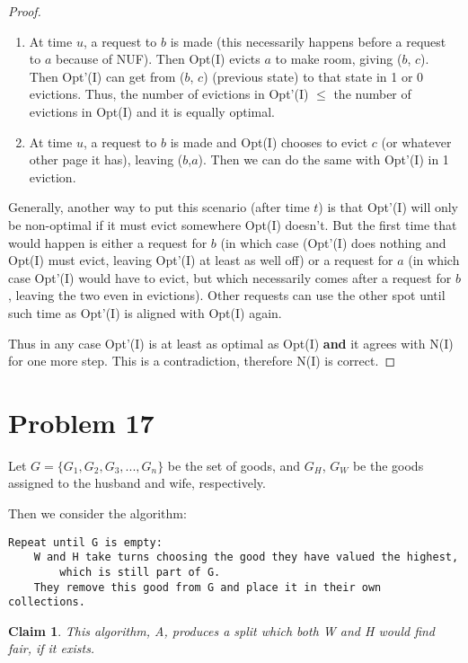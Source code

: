 \documentclass{article}
\newtheorem{thm}{Claim}
\providecommand{\prob}[1]{\section*{Problem #1}}
\begin{document}
\begin{proof}
\begin{enumerate}[label=\textbf{Case \arabic*.}]
			\item  At time $u$, a request to $b$ is made (this necessarily happens before a request to $a$ because of NUF). Then Opt(I) evicts $a$ to make room, giving ($b$, $c$). Then Opt'(I) can get from ($b$, $c$) (previous state) to that state in 1 or 0 evictions. Thus, the number of evictions in Opt'(I) $\leq$ the number of evictions in Opt(I) and it is equally optimal.
			
		 	\item At time $u$, a request to $b$ is made and Opt(I) chooses to evict $c$ (or whatever other page it has), leaving ($b$,$a$). Then we can do the same with Opt'(I) in 1 eviction.
		\end{enumerate}
	
		Generally, another way to put this scenario (after time $t$) is that Opt'(I) will only be non-optimal if it must evict somewhere Opt(I) doesn't. But the first time that would happen is either a request for $b$ (in which case (Opt'(I) does nothing and Opt(I) must evict, leaving Opt'(I) at least as well off) or a request for $a$ (in which case Opt'(I) would have to evict, but which necessarily comes after a request for $b$, leaving the two even in evictions). Other requests can use the other spot until such time as Opt'(I) is aligned with Opt(I) again.
	
		Thus in any case Opt'(I) is at least as optimal as Opt(I) \textbf{and} it agrees with N(I) for one more step. This is a contradiction, therefore N(I) is correct.
	\end{proof}

	\prob{17}
	Let $G = \{G_1, G_2, G_3, ..., G_n\}$ be the set of goods, and $G_H$, $G_W$ be the goods assigned to the husband and wife, respectively.
	
	Then we consider the algorithm:

	\begin{lstlisting}
Repeat until G is empty:
	W and H take turns choosing the good they have valued the highest,
		which is still part of G.
	They remove this good from G and place it in their own collections.
	\end{lstlisting}
	
	\begin{thm}
		This algorithm, A, produces a split which both W and H would find fair, if it exists.
	\end{thm}
\end{document}
